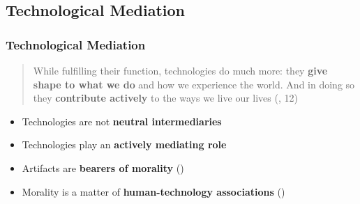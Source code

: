 \documentclass{beamer}
\begin{document}
\subsection{Technological Mediation}
\begin{frame}[fragile]
\frametitle{Technological Mediation}
\begin{quote}While fulfilling their function, technologies do much more: they \textbf{give shape to what we do} and how we experience the world. 
	And in doing so they \textbf{contribute actively} to the ways we live our lives (\cite{verbeek2011moralizing}, 12)
\end{quote}

\begin{itemize}
	\item Technologies are not \textbf{neutral intermediaries}
	\item Technologies play an \textbf{actively mediating role} 
	\medskip
	\item Artifacts are \textbf{bearers of morality} (\cite{latour1992})
	

	\item Morality is a matter of \textbf{human-technology associations} (\cite{verbeek2011moralizing})

\end{itemize}


\end{frame}
\end{document}
